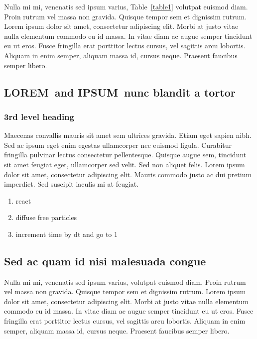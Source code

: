 \documentclass[10pt,letterpaper]{article}
\newcommand{\lorem}{{\bf LOREM}}
\newcommand{\ipsum}{{\bf IPSUM}}
\begin{document}
Nulla mi mi, venenatis sed ipsum varius, Table~\ref{table1} volutpat euismod diam. Proin rutrum vel massa non gravida. Quisque tempor sem et dignissim rutrum. Lorem ipsum dolor sit amet, consectetur adipiscing elit. Morbi at justo vitae nulla elementum commodo eu id massa. In vitae diam ac augue semper tincidunt eu ut eros. Fusce fringilla erat porttitor lectus cursus, vel sagittis arcu lobortis. Aliquam in enim semper, aliquam massa id, cursus neque. Praesent faucibus semper libero.




\subsection*{\lorem\ and \ipsum\ nunc blandit a tortor}
\subsubsection*{3rd level heading} 
Maecenas convallis mauris sit amet sem ultrices gravida. Etiam eget sapien nibh. Sed ac ipsum eget enim egestas ullamcorper nec euismod ligula. Curabitur fringilla pulvinar lectus consectetur pellentesque. Quisque augue sem, tincidunt sit amet feugiat eget, ullamcorper sed velit. Sed non aliquet felis. Lorem ipsum dolor sit amet, consectetur adipiscing elit. Mauris commodo justo ac dui pretium imperdiet. Sed suscipit iaculis mi at feugiat. 

\begin{enumerate}
	\item{react}
	\item{diffuse free particles}
	\item{increment time by dt and go to 1}
\end{enumerate}


\subsection*{Sed ac quam id nisi malesuada congue}

Nulla mi mi, venenatis sed ipsum varius, volutpat euismod diam. Proin rutrum vel massa non gravida. Quisque tempor sem et dignissim rutrum. Lorem ipsum dolor sit amet, consectetur adipiscing elit. Morbi at justo vitae nulla elementum commodo eu id massa. In vitae diam ac augue semper tincidunt eu ut eros. Fusce fringilla erat porttitor lectus cursus, vel sagittis arcu lobortis. Aliquam in enim semper, aliquam massa id, cursus neque. Praesent faucibus semper libero.
\end{document}
